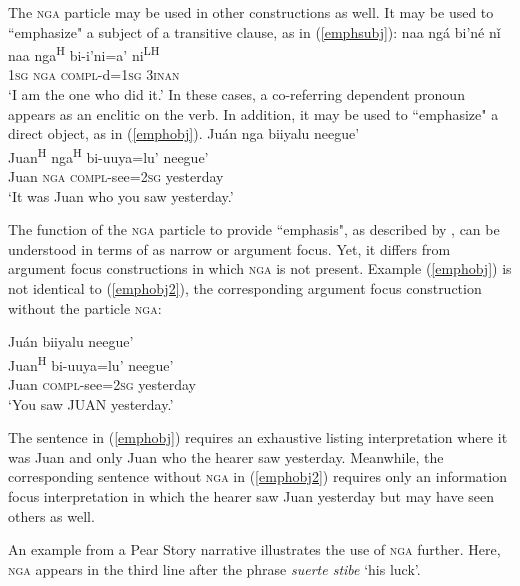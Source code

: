 The \textsc{nga} particle may be used in other constructions as well. It may be used to ``emphasize" a subject of a transitive clause, as in (\ref{emphsubj}):
\ea\label{emphsubj}
\glll naa ng\'{a} bi'n\'{e} n\v{i} \\
naa nga\textsuperscript{H} bi-i'ni=a' ni\textsuperscript{LH} \\
1\textsc{sg} \textsc{nga} \textsc{compl}-d=1\textsc{sg} 3\textsc{inan} \\
\glt `I am the one who did it.' \hfill \citep[98]{pickett1998}
\z
In these cases, a co-referring dependent pronoun appears as an enclitic on the verb. In addition, it may  be used to ``emphasize" a direct object, as in (\ref{emphobj}).
\ea\label{emphobj} 
\glll Ju\'{a}n nga biiyalu neegue' \\
Juan\textsuperscript{H} nga\textsuperscript{H} bi-uuya=lu' neegue' \\
Juan \textsc{nga} \textsc{compl}-see=2\textsc{sg} yesterday \\
\glt `It was Juan who you saw yesterday.' \hfill \citep[98]{pickett1998}

\z
The function of the \textsc{nga} particle to provide ``emphasis", as described by \citet{pickett1998}, can be understood in terms of \citet{lambrecht1994} as narrow or argument focus. Yet, it differs from argument focus constructions in which \textsc{nga} is not present. Example (\ref{emphobj}) is not identical to (\ref{emphobj2}), the corresponding argument focus construction without the particle \textsc{nga}:

\ea\label{emphobj2}
\glll Ju\'{a}n biiyalu neegue' \\
Juan\textsuperscript{H} bi-uuya=lu' neegue' \\
Juan \textsc{compl}-see=2\textsc{sg} yesterday \\
\glt `You saw JUAN yesterday.'

\z
The sentence in (\ref{emphobj}) requires an exhaustive listing interpretation where it was Juan and only Juan who the hearer saw yesterday. Meanwhile, the corresponding sentence without \textsc{nga} in (\ref{emphobj2}) requires only an information focus interpretation in which the hearer saw Juan yesterday but may have seen others as well.


An example from a Pear Story narrative illustrates the use of \textsc{nga} further. Here, \textsc{nga} appears in the third line after the phrase \textit{suerte stibe} `his luck'.

